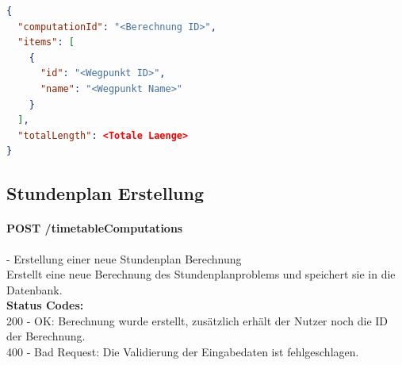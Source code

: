 \begin{lstlisting}[language=JSON, caption=Beispiel eines Endresultates für das Briefträgerproblem, label=lst:solution_postman]  
{
  "computationId": "<Berechnung ID>",
  "items": [
    {
      "id": "<Wegpunkt ID>",
      "name": "<Wegpunkt Name>"
    }
  ],
  "totalLength": <Totale Laenge>
}
\end{lstlisting}

%
%
%
%

\subsection{Stundenplan Erstellung}

\paragraph{POST /timetableComputations} - Erstellung einer neue Stundenplan Berechnung\mbox{}\\
Erstellt eine neue Berechnung des Stundenplanproblems und speichert sie in die Datenbank.\\
\textbf{Status Codes:}\\
200 - OK: Berechnung wurde erstellt, zusätzlich erhält der Nutzer noch die ID der Berechnung.\\
400 - Bad Request: Die Validierung der Eingabedaten ist fehlgeschlagen.\\

